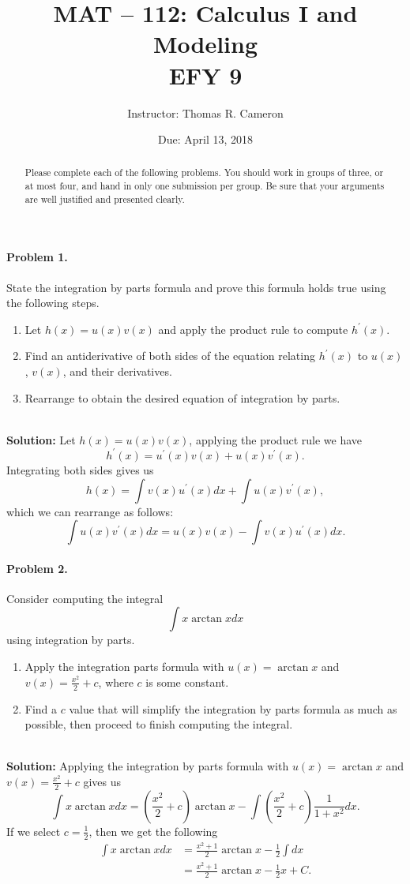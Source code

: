 \documentclass{article}
\title{MAT -- 112: Calculus I and Modeling\\
\large{EFY 9}}
\author{Instructor: Thomas R. Cameron}
\date{Due: April 13, 2018}
\begin{document}
\maketitle

\begin{abstract}
Please complete each of the following problems. You should work in groups of three, or at most four, and hand in only one submission per group. Be sure that your arguments are well justified and presented clearly.
\end{abstract}

\paragraph*{Problem 1.} State the integration by parts formula and prove this formula holds true using the following steps.
\begin{enumerate}
\item	Let $h(x)=u(x)v(x)$ and apply the product rule to compute $h^{'}(x)$. 
\item	Find an antiderivative of both sides of the equation relating $h^{'}(x)$ to $u(x)$, $v(x)$, and their derivatives. 
\item	Rearrange to obtain the desired equation of integration by parts. 
\end{enumerate}
~\\
\textbf{Solution:} Let $h(x)=u(x)v(x)$, applying the product rule we have
\[
h^{'}(x)=u^{'}(x)v(x)+u(x)v^{'}(x).
\]
Integrating both sides gives us
\[
h(x)=\int v(x)u^{'}(x)dx + \int u(x)v^{'}(x),
\]
which we can rearrange as follows:
\[
\int u(x)v^{'}(x)dx = u(x)v(x) - \int v(x)u^{'}(x)dx.
\]

\paragraph*{Problem 2.} Consider computing the integral
\[
\int x\arctan x dx
\]
using integration by parts. 
\begin{enumerate}
\item	Apply the integration parts formula with $u(x)=\arctan x$ and $v(x)=\frac{x^{2}}{2}+c$, where $c$ is some constant. 
\item	Find a $c$ value that will simplify the integration by parts formula as much as possible, then proceed to finish computing the integral. 
\end{enumerate}
~\\
\textbf{Solution:} Applying the integration by parts formula with $u(x)=\arctan x$ and $v(x)=\frac{x^{2}}{2}+c$ gives us
\[
\int x\arctan x dx = \left(\frac{x^{2}}{2}+c\right)\arctan x - \int \left(\frac{x^{2}}{2}+c\right)\frac{1}{1+x^{2}}dx.
\]
If we select $c=\frac{1}{2}$, then we get the following
\begin{align*}
\int x\arctan x dx &= \frac{x^{2}+1}{2}\arctan x - \frac{1}{2}\int dx \\
&=\frac{x^{2}+1}{2}\arctan x - \frac{1}{2}x + C.
\end{align*}
\end{document}
